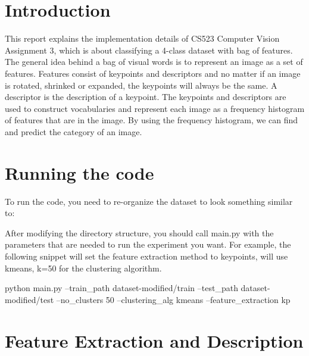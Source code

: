\section*{Introduction}

This report explains the implementation details of CS523 Computer Vision
Assignment 3, which is about classifying a 4-class dataset with bag of features.
The general idea behind a bag of visual words is to represent an image as a set
of features. Features consist of keypoints and descriptors and no matter if an
image is rotated, shrinked or expanded, the keypoints will always be the same. A
descriptor is the description of a keypoint. The keypoints and descriptors are
used to construct vocabularies and represent each image as a frequency histogram
of features that are in the image. By using the frequency histogram, we can
find and predict the category of an image.

\section*{Running the code}
To run the code, you need to re-organize the dataset to look something similar
to:


After modifying the directory structure, you should call main.py with the
parameters that are needed to run the experiment you want. For example, the
following snippet will set the feature extraction method to keypoints, will use
kmeans, k=50 for the clustering algorithm.

python main.py --train\_path dataset-modified/train --test\_path
dataset-modified/test --no\_clusters 50 --clustering\_alg kmeans --feature\_extraction kp



\section*{Feature Extraction and Description}




